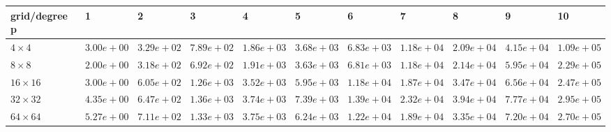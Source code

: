 \begin{tabular}{lllllllllll}
\hline
 grid/degree p   & 1          & 2          & 3          & 4          & 5          & 6          & 7          & 8          & 9          & 10         \\
\hline
 $4 \times 4$    & $3.00e+00$ & $3.29e+02$ & $7.89e+02$ & $1.86e+03$ & $3.68e+03$ & $6.83e+03$ & $1.18e+04$ & $2.09e+04$ & $4.15e+04$ & $1.09e+05$ \\
 $8 \times 8$    & $2.00e+00$ & $3.18e+02$ & $6.92e+02$ & $1.91e+03$ & $3.63e+03$ & $6.81e+03$ & $1.18e+04$ & $2.14e+04$ & $5.95e+04$ & $2.29e+05$ \\
 $16 \times 16$  & $3.00e+00$ & $6.05e+02$ & $1.26e+03$ & $3.52e+03$ & $5.95e+03$ & $1.18e+04$ & $1.87e+04$ & $3.47e+04$ & $6.56e+04$ & $2.47e+05$ \\
 $32 \times 32$  & $4.35e+00$ & $6.47e+02$ & $1.36e+03$ & $3.74e+03$ & $7.39e+03$ & $1.39e+04$ & $2.32e+04$ & $3.94e+04$ & $7.77e+04$ & $2.95e+05$ \\
 $64 \times 64$  & $5.27e+00$ & $7.11e+02$ & $1.33e+03$ & $3.75e+03$ & $6.24e+03$ & $1.22e+04$ & $1.89e+04$ & $3.35e+04$ & $7.20e+04$ & $2.70e+05$ \\
\hline
\end{tabular}